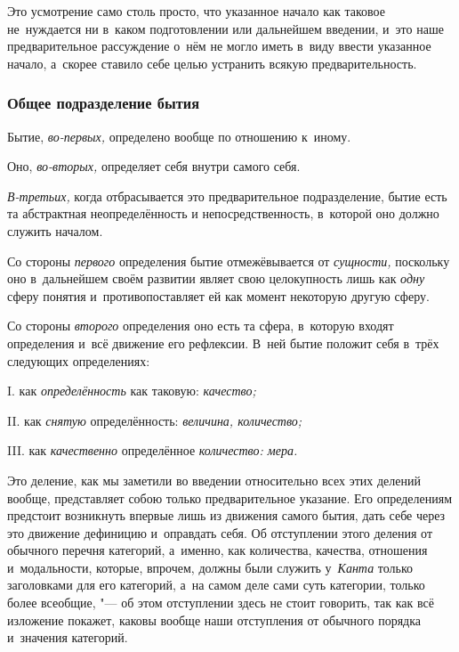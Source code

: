 Это усмотрение само столь просто, что указанное начало как таковое
не~нуждается ни в~каком подготовлении или дальнейшем введении, и~это наше
предварительное рассуждение о~нём не могло иметь в~виду ввести указанное
начало, а~скорее ставило себе целью устранить всякую предварительность.

\subsubsection{Общее подразделение бытия}
\renewcommand\rightmark{\memUChead{Общее подразделение бытия}}

Бытие, {\em во-первых,} определено вообще по отношению к~иному.

Оно, {\em во-вторых,} определяет себя внутри самого себя.

{\em В-третьих,} когда отбрасывается это предварительное
подразделение, бытие есть та абстрактная неопределённость и
непосредственность, в~которой оно должно служить началом.

Со стороны {\em первого} определения бытие отмежёвывается от {\em сущности,}
поскольку оно в~дальнейшем своём развитии являет свою целокупность лишь как
{\em одну} сферу понятия и~противопоставляет ей как момент
некоторую другую сферу.

Со стороны {\em второго} определения оно есть та сфера, в~которую входят
определения и~всё движение его рефлексии. В~ней бытие положит себя в~трёх
следующих определениях:

I. как {\em определённость} как таковую: {\em качество;}

II. как {\em снятую} определённость: {\em величина, количество;}

III. как {\em качественно} определённое {\em количество: мера.}

Это деление, как мы заметили во введении относительно всех этих делений вообще,
представляет собою только предварительное указание. Его определениям предстоит
возникнуть впервые лишь из движения самого бытия, дать себе через это движение
дефиницию и~оправдать себя. Об отступлении этого деления от обычного перечня
категорий, а~именно, как количества, качества, отношения и~модальности,
которые, впрочем, должны были служить у~{\em Канта} только заголовками для его
категорий, а~на самом деле сами суть категории, только более всеобщие, "--- об
этом отступлении здесь не стоит говорить, так как всё изложение покажет, каковы
вообще наши отступления от обычного порядка и~значения категорий.

